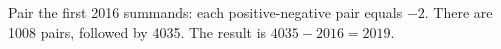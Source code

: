Pair the first 2016 summands: each positive-negative pair equals $-2 $. There are 1008 pairs, followed by 4035. The result is $ 4035-2016=\boxed{2019}$.
